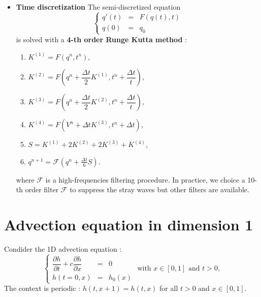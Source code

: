 \documentclass{sciposter}
\begin{document}
\begin{multicols}{3}
\begin{itemize}
\item \textbf{Time discretization} The semi-discretized equation
\begin{equation}
\left\lbrace
\begin{array}{rcl}
q'(t) &=& F(q(t),t)\\
q(0)  &=& q_0 
\end{array}
\right.
\end{equation}
is solved with a \textbf{4-th order Runge Kutta method} :
\begin{center}
\begin{enumerate}
\item $K^{(1)} = F \left( q^n, t^n \right)$,
\item $K^{(2)} = F \left( q^n + \dfrac{\Delta t}{2} K^{(1)}, t^n + \dfrac{\Delta t}{t}\right)$,
\item $K^{(3)} = F \left( q^n + \dfrac{\Delta t}{2} K^{(2)}, t^n + \dfrac{\Delta t}{t}\right)$,
\item $K^{(4)} = F \left( V^n + \Delta t K^{(3)}, t^n + \Delta t\right)$,  
\item $S = K^{(1)} + 2 K^{(2)} + 2 K^{(3)} + K^{(4)}$,
\item $q^{n+1} = \mathcal{F} \left( q^n  + \frac{\Delta t}{6} S \right)$.
\end{enumerate}
\end{center}

where $\mathcal{F}$ is a high-frequencies filtering procedure.
In practice, we choice a 10-th order filter $\mathcal{F}$ to suppress the stray waves but other filters are available. 
\end{itemize}




\section{Advection equation in dimension 1}
Condider the 1D advection equation :
\begin{equation}
\left\lbrace
\begin{array}{rcl}
\dfrac{\partial h}{\partial t} + c \dfrac{\partial h}{\partial x} & = & 0 \\
h(t=0,x) & = & h_0(x)
\end{array}
\right. \text{ with } x \in [0,1] \text{ and } t>0,
\label{eq:advection1D}
\end{equation}
The context is periodic : $h(t,x+1) = h(t,x)$ for all $t>0$ and $x \in [0,1]$.


\end{multicols}
\end{document}
